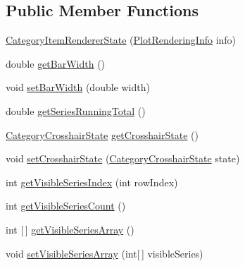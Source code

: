 \subsection*{Public Member Functions}
\begin{DoxyCompactItemize}
\item 
\mbox{\hyperlink{classorg_1_1jfree_1_1chart_1_1renderer_1_1category_1_1_category_item_renderer_state_a6683eca2d5f9fbabd84e06161f3f5ae4}{Category\+Item\+Renderer\+State}} (\mbox{\hyperlink{classorg_1_1jfree_1_1chart_1_1plot_1_1_plot_rendering_info}{Plot\+Rendering\+Info}} info)
\item 
double \mbox{\hyperlink{classorg_1_1jfree_1_1chart_1_1renderer_1_1category_1_1_category_item_renderer_state_a8c9ac59a1be97bd9528e30cee6d60f09}{get\+Bar\+Width}} ()
\item 
void \mbox{\hyperlink{classorg_1_1jfree_1_1chart_1_1renderer_1_1category_1_1_category_item_renderer_state_afab9715d8005aec6509212dbac5575b8}{set\+Bar\+Width}} (double width)
\item 
double \mbox{\hyperlink{classorg_1_1jfree_1_1chart_1_1renderer_1_1category_1_1_category_item_renderer_state_a28b99679ed8524dd8b8d3d4b0dee912b}{get\+Series\+Running\+Total}} ()
\item 
\mbox{\hyperlink{classorg_1_1jfree_1_1chart_1_1plot_1_1_category_crosshair_state}{Category\+Crosshair\+State}} \mbox{\hyperlink{classorg_1_1jfree_1_1chart_1_1renderer_1_1category_1_1_category_item_renderer_state_a1643863db46b2b247a24e7d297b512e1}{get\+Crosshair\+State}} ()
\item 
void \mbox{\hyperlink{classorg_1_1jfree_1_1chart_1_1renderer_1_1category_1_1_category_item_renderer_state_aca8f9ffa3ab8ed01189ca4c654761adc}{set\+Crosshair\+State}} (\mbox{\hyperlink{classorg_1_1jfree_1_1chart_1_1plot_1_1_category_crosshair_state}{Category\+Crosshair\+State}} state)
\item 
int \mbox{\hyperlink{classorg_1_1jfree_1_1chart_1_1renderer_1_1category_1_1_category_item_renderer_state_aff184144c7cb01160ec2277b76fad6a1}{get\+Visible\+Series\+Index}} (int row\+Index)
\item 
int \mbox{\hyperlink{classorg_1_1jfree_1_1chart_1_1renderer_1_1category_1_1_category_item_renderer_state_a7816c579db80e7d8e40b94ddaa2e593d}{get\+Visible\+Series\+Count}} ()
\item 
int \mbox{[}$\,$\mbox{]} \mbox{\hyperlink{classorg_1_1jfree_1_1chart_1_1renderer_1_1category_1_1_category_item_renderer_state_a75147e083dccad24e7809c1e3dfc863f}{get\+Visible\+Series\+Array}} ()
\item 
void \mbox{\hyperlink{classorg_1_1jfree_1_1chart_1_1renderer_1_1category_1_1_category_item_renderer_state_a2d5383dca6367b725a2de2c0f18c8fa3}{set\+Visible\+Series\+Array}} (int\mbox{[}$\,$\mbox{]} visible\+Series)
\end{DoxyCompactItemize}


